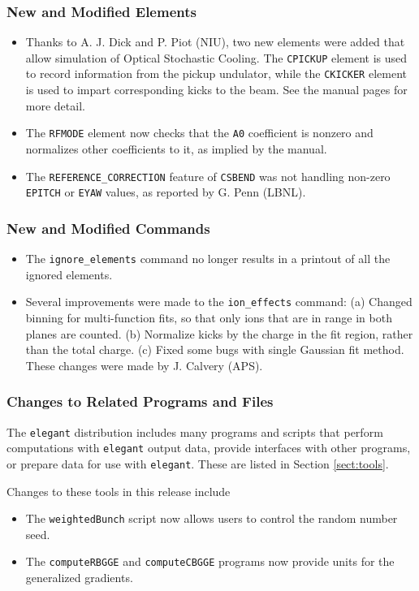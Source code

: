 \documentclass[11pt]{article}
\begin{document}
\subsubsection{New and Modified Elements}
\begin{itemize}
\item Thanks to A. J. Dick and P. Piot (NIU), two new elements were added that allow simulation
  of Optical Stochastic Cooling. The \verb|CPICKUP| element is used to record information from
  the pickup undulator, while the \verb|CKICKER| element is used to impart corresponding
  kicks to the beam. See the manual pages for more detail.
\item The \verb|RFMODE| element now checks that the \verb|A0| coefficient is nonzero and normalizes
  other coefficients to it, as implied by the manual.
\item The \verb|REFERENCE_CORRECTION| feature of \verb|CSBEND| was not handling non-zero \verb|EPITCH| or
  \verb|EYAW| values, as reported by  G. Penn (LBNL).
\end{itemize}

\subsubsection{New and Modified Commands}
\begin{itemize}
\item The \verb|ignore_elements| command no longer results in a printout of all the ignored elements.
\item Several improvements were made to the \verb|ion_effects| command: (a) Changed binning for multi-function fits, so
  that only ions that are in range in both planes are counted. (b) Normalize kicks by the charge in the fit region,
  rather than the total charge. (c) Fixed some bugs with single Gaussian fit method. These changes were made by J. Calvery (APS).
\end{itemize}

\subsubsection{Changes to Related Programs and Files}

The {\tt elegant} distribution includes many programs and scripts that perform computations with {\tt elegant}
output data, provide interfaces with other programs, or prepare data for use with {\tt elegant}. These
are listed in Section \ref{sect:tools}. 

Changes to these tools in this release include
\begin{itemize}
\item The \verb|weightedBunch| script now allows users to control the random number seed.
\item The \verb|computeRBGGE| and \verb|computeCBGGE| programs now provide units for the generalized gradients.
\end{itemize}
\end{document}
